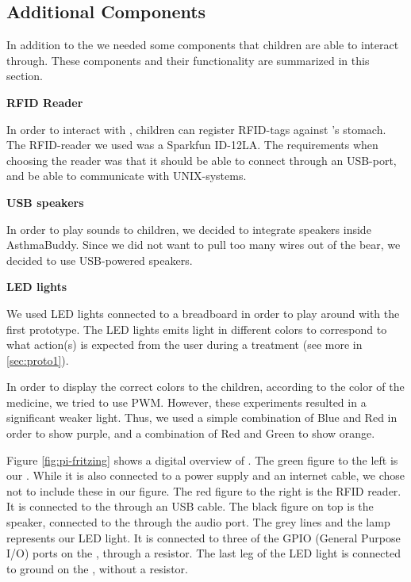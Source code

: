   
\subsection{Additional Components}
\label{sec:additionalcomponents}
In addition to the \rpi{} we needed some components that children are able to interact through. These components and their functionality are summarized in this section. 


\textbf{RFID Reader}

In order to interact with \ab{}, children can register RFID-tags against \ab{}'s stomach. The RFID-reader we used was a Sparkfun ID-12LA. The requirements when choosing the reader was that it should be able to connect through an USB-port, and be able to communicate with UNIX-systems.
         
\textbf{USB speakers}

In order to play sounds to children, we decided to integrate speakers inside AsthmaBuddy. Since we did not want to pull too many wires out of the bear, we decided to use USB-powered speakers.    


\textbf{LED lights}

We used LED lights connected to a breadboard in order to play around with the first prototype. The LED lights emits light in different colors to correspond to what action(s) is expected from the user during a treatment (see more in \ref{sec:proto1}). 

In order to display the correct colors to the children, according to the color of the medicine, we tried to use PWM. However, these experiments resulted in a significant weaker light. Thus, we used a simple combination of Blue and Red in order to show purple, and a combination of Red and Green to show orange.  

 
Figure \ref{fig:pi-fritzing} shows a digital overview of \buddy{}. The green figure to the left is our \rpi{}. While it is also connected to a power supply and an internet cable, we chose not to include these in our figure. The red figure to the right is the RFID reader. It is connected to the \rpi{} through an USB cable. The black figure on top is the speaker, connected to the \rpi{} through the audio port. 
The grey lines and the lamp represents our LED light. It is connected to three of the GPIO (General Purpose I/O) ports on the \rpi{}, through a resistor. The last leg of the LED light is connected to ground on the \rpi{}, without a resistor.


